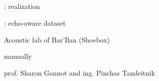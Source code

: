 \subsection{\dechorate}

\begin{frame}[t]{\dechorate: realization}

    \vspace{-2mm}
    \begin{block}{\dechorate: echo-aware dataset}
        \begin{description}
            \item<2->[Recorded:] Acoustic lab of Bar'Ilan (Shoebox)
            \item<3->[Annotated:] manually
            \item<4->[Collaboration:]  prof. Sharon Gannot and ing. Pinchas Tandeitnik
        \end{description}
    \end{block}



\end{frame}
